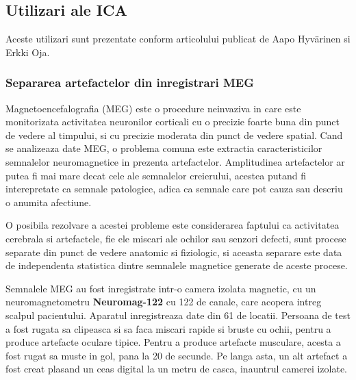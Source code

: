\documentclass[12pt,oneside]{article}
\begin{document}
\subsection{Utilizari ale ICA} 

Aceste utilizari sunt prezentate conform articolului publicat de Aapo Hyvärinen si Erkki Oja.\cite{hyvarien}

\subsubsection{Separarea artefactelor din inregistrari MEG}
Magnetoencefalografia (MEG) este o procedure neinvaziva in care este monitorizata activitatea neuronilor corticali cu o precizie foarte buna din punct de vedere al timpului, si cu precizie moderata din punct de vedere spatial. Cand se analizeaza date MEG, o problema comuna este extractia caracteristicilor semnalelor neuromagnetice in prezenta artefactelor. Amplitudinea artefactelor ar putea fi mai mare decat cele ale semnalelor creierului, acestea putand fi interepretate ca semnale patologice, adica ca semnale care pot cauza sau descriu o anumita afectiune.

O posibila rezolvare a acestei probleme este considerarea faptului ca activitatea cerebrala si artefactele, fie ele miscari ale ochilor sau senzori defecti, sunt procese separate din punct de vedere anatomic si fiziologic, si aceasta separare este data de independenta statistica dintre semnalele magnetice generate de aceste procese.

Semnalele MEG au fost inregistrate intr-o camera izolata magnetic, cu un neuromagnetometru \textbf{Neuromag-122} cu 122 de canale, care acopera intreg scalpul pacientului. Aparatul inregistreaza date din 61 de locatii. Persoana de test a fost rugata sa clipeasca si sa faca miscari rapide si bruste cu ochii, pentru a produce artefacte oculare tipice. Pentru a produce artefacte musculare, acesta a fost rugat sa muste in gol, pana la 20 de secunde. Pe langa asta, un alt artefact a fost creat plasand un ceas digital la un metru de casca, inauntrul camerei izolate.
\end{document}
